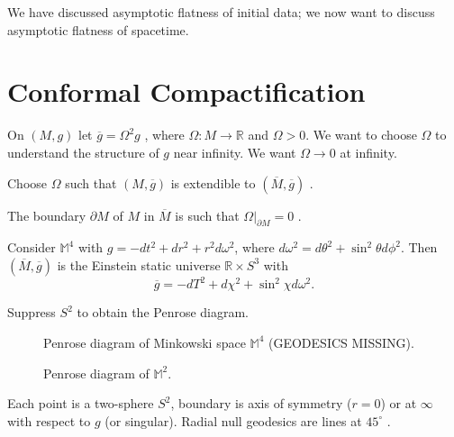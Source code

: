 We have discussed asymptotic flatness of initial data; we now want to discuss asymptotic flatness of spacetime.

\section{Conformal Compactification}%
\label{sec:conformal_compactification}

On $(M, g)$  let $\overline{g}{} = \Omega^2 g$ , where $\Omega \colon M \to \mathbb{R}$  and $\Omega > 0$.
We want to choose  $\Omega$  to understand the structure of $g$ near infinity.
We want $\Omega \to 0$ at infinity.

Choose  $\Omega$  such that $(M, \overline{g}{})$  is extendible to $(\overline{M}{}, \overline{g}{})$ .
\begin{figure}[tbhp]
  \centering
  \def\svgwidth{0.4\columnwidth}
  
  \caption{}
  \label{fig:l11f1}
\end{figure}
The boundary $\partial M$  of $M$  in $\overline{M}{}$  is such that $\Omega \rvert_{\partial M} = 0$ .
\begin{example}[]
  Consider $\mathbb{M}^4$ with $g = - dt^2 + dr^2 + r^2 d \omega^2$, where $d\omega^2 = d \theta^2 + \sin ^2 \theta d \phi^2$.
  Then $(\overline{M}{}, \overline{g})$ is the Einstein static universe $\mathbb{R} \times S^{3}$ with 
  \begin{equation}
    \overline{g}{} = - dT^2 + d \chi^2 + \sin^2 \chi d\omega^2.
  \end{equation}
  \begin{figure}[tbhp]
    \centering
    \def\svgwidth{0.4\columnwidth}
    
    \caption{}
    \label{fig:l11f2}
  \end{figure}
  Suppress $S^2$ to obtain the Penrose diagram.
   \begin{figure}[tbhp]
     \centering
     \begin{minipage}[t]{0.5\columnwidth}
       \centering
       \def\svgwidth{0.4\columnwidth}
       
       \caption{Penrose diagram of Minkowski space $\mathbb{M}^4$ (GEODESICS MISSING).}
       \label{fig:l11f3}
     \end{minipage}%
     \begin{minipage}[t]{0.5\columnwidth}
       \centering
       \def\svgwidth{0.8\columnwidth}
       
       \caption{Penrose diagram of $\mathbb{M}^2$.}
       \label{fig:l11f4}
     \end{minipage}
  \end{figure}
  Each point is a two-sphere $S^2$, boundary is axis of symmetry ($r =0$) or at $\infty$ with respect to $g$ (or singular).
  Radial null geodesics are lines at $45^\circ$ .
\end{example}


